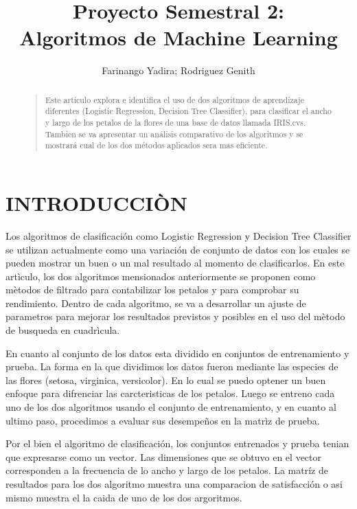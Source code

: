 \documentclass[letterpaper]{article}
\begin{document}
%
\title{Proyecto Semestral 2: \\Algoritmos de Machine Learning {}}
\author{Farinango Yadira; Rodriguez Genith\\
}
\maketitle
\begin{abstract}
\begin{quote}
Este artículo explora e identifica el uso de dos algoritmos de aprendizaje diferentes (Logistic Regression, Decision Tree Classifier), para clasificar el ancho y largo de los petalos de la flores de una base de datos llamada IRIS.cvs. Tambien se va apresentar un análisis comparativo de los algoritmos y se mostrará cual de los dos métodos aplicados sera mas eficiente.
\end{quote}
\end{abstract}

\section{INTRODUCCIÒN}
Los algoritmos de clasificación como Logistic Regression y Decision Tree Classifier se utilizan actualmente como una variación de conjunto de datos con los cuales se pueden mostrar un buen o un mal resultado al momento de clasificarlos.
En este artìculo, los dos algoritmos mensionados anteriormente se proponen como mètodos de filtrado para contabilizar los petalos y para comprobar su rendimiento. Dentro de cada algoritmo, se va a desarrollar un ajuste de parametros para mejorar los resultados previstos y posibles en el uso del mètodo de busqueda en cuadrìcula.

En cuanto al conjunto de los datos esta dividido en conjuntos de entrenamiento y prueba. La forma en la que dividimos los datos fueron mediante las especies de las flores (setosa, virginica, versicolor). En lo cual se puedo optener un buen enfoque para difrenciar las carcteristicas de los petalos. Luego se entreno cada uno de los dos algoritmos usando el conjunto de entrenamiento, y en cuanto al ultimo paso, procedimos a evaluar sus desempeños en la matrìz de prueba.

Por el bien el algoritmo de clasificación, los conjuntos entrenados y prueba tenian que expresarse como un vector. Las dimensiones que se obtuvo en el vector corresponden a la frecuencia de lo ancho y largo de los petalos. La matríz de resultados para los dos algoritmo muestra una comparacion de satisfacción o asi mismo muestra el la caida de uno de los dos argoritmos.
\end{document}
